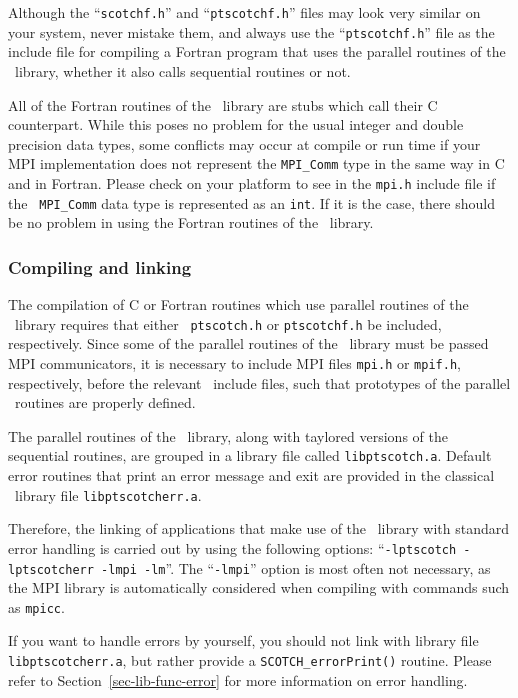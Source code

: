 Although the ``{\tt scotchf.h}'' and ``{\tt ptscotchf.h}'' files may
look very similar on your system, never mistake them, and always use
the ``{\tt ptscotchf.h}'' file as the include file for compiling a
Fortran program that uses the parallel routines of the
\libscotch\ library, whether it also calls sequential routines or not.

All of the Fortran routines of the \libscotch\ library are stubs which
call their C counterpart. While this poses no problem for the usual
integer and double precision data types, some conflicts may occur at
compile or run time if your MPI implementation does not represent the
{\tt MPI\_Comm} type in the same way in C and in Fortran. Please check
on your platform to see in the {\tt mpi.h} include file if the {\tt
MPI\_Comm} data type is represented as an {\tt int}. If it is the
case, there should be no problem in using the Fortran routines of
the \ptscotch\ library.

\subsubsection{Compiling and linking}

The compilation of C or Fortran routines which use parallel
routines of the \libscotch\ library requires that either {\tt
ptscotch.h} or {\tt ptscotchf.h} be included, respectively. Since some
of the parallel routines of the \libscotch\ library must be passed MPI
communicators, it is necessary to include MPI files {\tt mpi.h} or
{\tt mpif.h}, respectively, before the relevant \ptscotch\ include
files, such that prototypes of the parallel \libscotch\ routines are
properly defined.

The parallel routines of the \libscotch\ library, along with
taylored versions of the sequential routines, are grouped in a
library file called {\tt libptscotch.a}. Default error routines that
print an error message and exit are provided in the classical
\scotch\ library file {\tt libptscotcherr.a}.

Therefore, the linking of applications that make use of the
\libscotch\ library with standard error handling is carried out by
using the following options: ``{\tt -lptscotch -lptscotcherr -lmpi -lm}''.
The ``{\tt -lmpi}'' option is most often not necessary, as the MPI
library is automatically considered when compiling with commands such
as {\tt mpicc}.

If you want to handle errors by yourself, you should not link with
library file {\tt libptscotcherr.a}, but rather provide a
{\tt SCOTCH\_\lbt error\lbt Print()} routine. Please refer to
Section~\ref{sec-lib-func-error} for more information on error handling.

